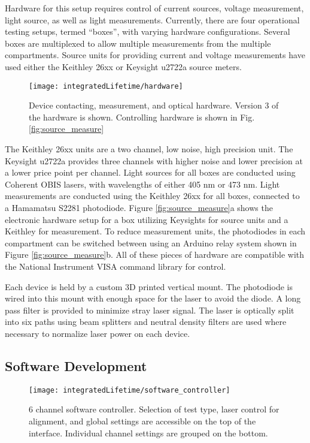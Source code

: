 \documentclass[../thesis.tex]{subfiles}
\begin{document}
Hardware for this setup requires control of current sources, voltage measurement, light source, as well as light measurements. 
Currently, there are four operational testing setups, termed ``boxes'', with varying hardware configurations.
Several boxes are multiplexed to allow multiple measurements from the multiple compartments.
Source units for providing current and voltage measurements have used either the Keithley 26xx or Keysight u2722a source meters.  

\begin{wrapfigure}{r}{.5\textwidth}
\centering
\texttt{[image: integratedLifetime/hardware]}
\caption{Device contacting, measurement, and optical hardware.  Version 3 of the hardware is shown.  Controlling hardware is shown in Fig. \ref{fig:source_measure}}
\label{fig:hardware}
\end{wrapfigure}
The Keithley 26xx units are a two channel, low noise, high precision unit.
The Keysight u2722a provides three channels with higher noise and lower precision at a lower price point per channel.
Light sources for all boxes are conducted using Coherent OBIS lasers, with wavelengths of either 405 nm or 473 nm.
Light measurements are conducted using the Keithley 26xx for all boxes, connected to a Hamamatsu S2281 photodiode.
Figure \ref{fig:source_measure}a shows the electronic hardware
 setup for a box utilizing Keysights for source units and a Keithley for measurement.
To reduce measurement units, the photodiodes in each compartment can be switched between using an Arduino relay system shown in Figure \ref{fig:source_measure}b.
All of these pieces of hardware are compatible with the National Instrument VISA command library for control.


Each device is held by a custom 3D printed vertical mount.  
The photodiode is wired into this mount with enough space for the laser to avoid the diode.
A long pass filter is provided to minimize stray laser signal.
The laser is optically split into six paths using beam splitters and neutral density filters are used where necessary to normalize laser power on each device.


\subsection{Software Development}

\begin{figure}[ht]
    \centering
    \texttt{[image: integratedLifetime/software\_controller]}
\caption{6 channel software controller.  Selection of test type, laser control for alignment, and global settings are accessible on the top of the interface.  Individual channel settings are grouped on the bottom.}
\label{fig:software_controller}
\end{figure}
\end{document}
